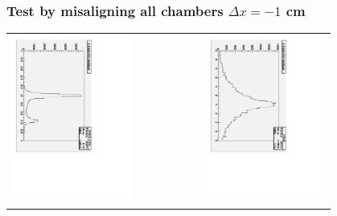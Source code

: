 \documentclass[compress]{beamer}
\begin{document}
\begin{frame}
\frametitle{Test by misaligning all chambers $\Delta x = -1$ cm}
\begin{center}
\begin{tabular}{p{0.4\linewidth} c p{0.4\linewidth}}
  \begin{minipage}{\linewidth}
    \includegraphics[height=\linewidth, angle=90]{globalMuon_x1cm_residuals.pdf}
  \end{minipage} & &
  \begin{minipage}{\linewidth}
    \includegraphics[height=\linewidth, angle=90]{trackerToMuon_x1cm_residuals_wide.pdf}

\end{minipage}
\end{tabular}
\end{center}
\end{frame}
\end{document}
